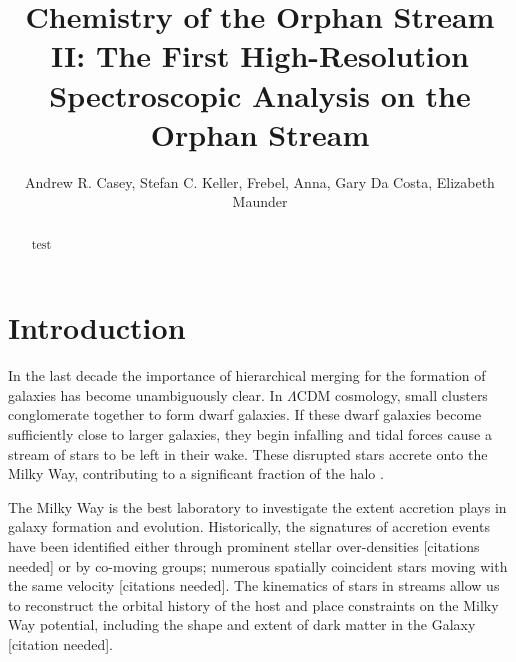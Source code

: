 \documentclass{emulateapj}
\begin{document}
\title{Chemistry of the Orphan Stream II: The First High-Resolution Spectroscopic Analysis on the Orphan Stream}

\author{Andrew R. Casey, Stefan C. Keller, Frebel, Anna, Gary Da Costa, Elizabeth Maunder}


\begin{abstract}
test
\end{abstract}


\section{Introduction}

In the last decade the importance of hierarchical merging for the formation of galaxies has become unambiguously clear. In $\Lambda$CDM cosmology, small clusters conglomerate together to form dwarf galaxies. If these dwarf galaxies become sufficiently close to larger galaxies, they begin infalling and tidal forces cause a stream of stars to be left in their wake. These disrupted stars accrete onto the Milky Way, contributing to a significant fraction of the halo \citet{Bell;et-al_2008}.

 

  The Milky Way is the best laboratory to investigate the extent accretion plays in galaxy formation and evolution. Historically, the signatures of accretion events have been identified either through prominent stellar over-densities [citations needed] or by co-moving groups; numerous spatially coincident stars moving with the same velocity [citations needed]. The kinematics of stars in streams allow us to reconstruct the orbital history of the host and place constraints on the Milky Way potential, including the shape and extent of dark matter in the Galaxy [citation needed]. 
 
\end{document}
